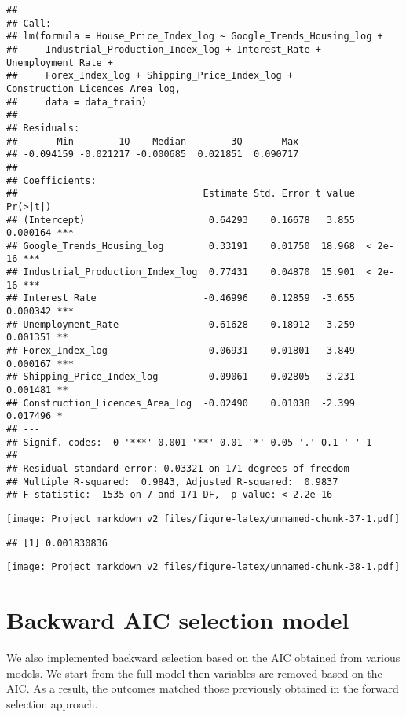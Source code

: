 \documentclass[
]{article}
\begin{document}
\begin{verbatim}
## 
## Call:
## lm(formula = House_Price_Index_log ~ Google_Trends_Housing_log + 
##     Industrial_Production_Index_log + Interest_Rate + Unemployment_Rate + 
##     Forex_Index_log + Shipping_Price_Index_log + Construction_Licences_Area_log, 
##     data = data_train)
## 
## Residuals:
##       Min        1Q    Median        3Q       Max 
## -0.094159 -0.021217 -0.000685  0.021851  0.090717 
## 
## Coefficients:
##                                 Estimate Std. Error t value Pr(>|t|)    
## (Intercept)                      0.64293    0.16678   3.855 0.000164 ***
## Google_Trends_Housing_log        0.33191    0.01750  18.968  < 2e-16 ***
## Industrial_Production_Index_log  0.77431    0.04870  15.901  < 2e-16 ***
## Interest_Rate                   -0.46996    0.12859  -3.655 0.000342 ***
## Unemployment_Rate                0.61628    0.18912   3.259 0.001351 ** 
## Forex_Index_log                 -0.06931    0.01801  -3.849 0.000167 ***
## Shipping_Price_Index_log         0.09061    0.02805   3.231 0.001481 ** 
## Construction_Licences_Area_log  -0.02490    0.01038  -2.399 0.017496 *  
## ---
## Signif. codes:  0 '***' 0.001 '**' 0.01 '*' 0.05 '.' 0.1 ' ' 1
## 
## Residual standard error: 0.03321 on 171 degrees of freedom
## Multiple R-squared:  0.9843, Adjusted R-squared:  0.9837 
## F-statistic:  1535 on 7 and 171 DF,  p-value: < 2.2e-16
\end{verbatim}

\texttt{[image: Project\_markdown\_v2\_files/figure-latex/unnamed-chunk-37-1.pdf]}

\begin{verbatim}
## [1] 0.001830836
\end{verbatim}

\texttt{[image: Project\_markdown\_v2\_files/figure-latex/unnamed-chunk-38-1.pdf]}

\section{Backward AIC selection
model}\label{backward-aic-selection-model}

We also implemented backward selection based on the AIC obtained from
various models. We start from the full model then variables are removed
based on the AIC. As a result, the outcomes matched those previously
obtained in the forward selection approach.
\end{document}
